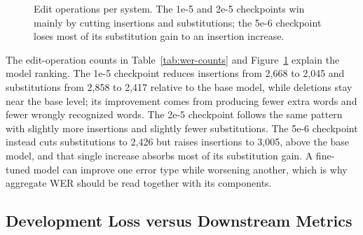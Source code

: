 \documentclass[11pt]{article}
\begin{document}
\begin{figure}[H]
  \centering
  \caption{Edit operations per system. The 1e-5 and 2e-5 checkpoints win mainly by cutting insertions and substitutions; the 5e-6 checkpoint loses most of its substitution gain to an insertion increase.}
  \label{fig:editops-chart}
\end{figure}

The edit-operation counts in Table~\ref{tab:wer-counts} and Figure~\ref{fig:editops-chart} explain the model ranking. The 1e-5 checkpoint reduces insertions from 2,668 to 2,045 and substitutions from 2,858 to 2,417 relative to the base model, while deletions stay near the base level; its improvement comes from producing fewer extra words and fewer wrongly recognized words. The 2e-5 checkpoint follows the same pattern with slightly more insertions and slightly fewer substitutions. The 5e-6 checkpoint instead cuts substitutions to 2,426 but raises insertions to 3,005, above the base model, and that single increase absorbs most of its substitution gain. A fine-tuned model can improve one error type while worsening another, which is why aggregate WER should be read together with its components.

\subsection{Development Loss versus Downstream Metrics}
\end{document}
